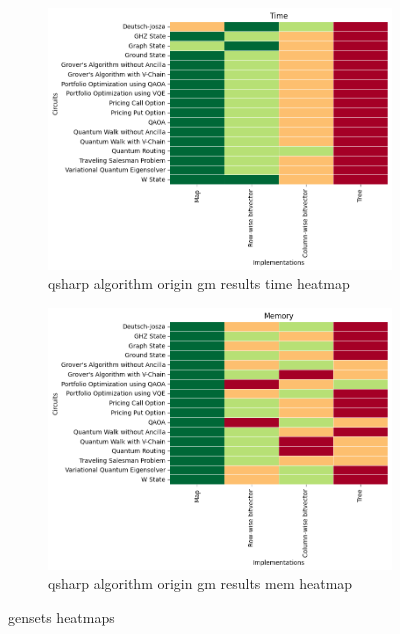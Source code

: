 
    \begin{figure}
    \centering
    \begin{subfigure}{.5\textwidth}
      \centering
      \includegraphics[width=1\linewidth]{benchmarks/./qsharp/gensets/algorithm/qsharp_algorithm_origin_gm_results_time_heatmap.png}
      \caption{qsharp algorithm origin gm results time heatmap}
      \label{fig:gensets_qsharp_algorithm_origin_gm_results_time_heatmap}
    \end{subfigure}
    \begin{subfigure}{.5\textwidth}
      \centering
      \includegraphics[width=1\linewidth]{benchmarks/./qsharp/gensets/algorithm/qsharp_algorithm_origin_gm_results_mem_heatmap.png}
      \caption{qsharp algorithm origin gm results mem heatmap}
      \label{fig:gensets_qsharp_algorithm_origin_gm_results_mem_heatmap}
    \end{subfigure}
    \caption{gensets heatmaps}
    \label{fig:gensets_qsharp_algorithm_origin_gm_results_heatmaps}
    \end{figure}
    